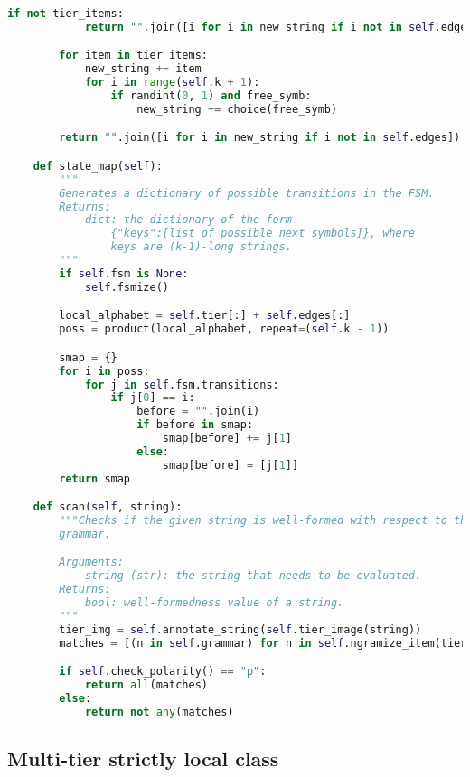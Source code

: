 \begin{lstlisting}[language=Python]
        if not tier_items:
            return "".join([i for i in new_string if i not in self.edges])

        for item in tier_items:
            new_string += item
            for i in range(self.k + 1):
                if randint(0, 1) and free_symb:
                    new_string += choice(free_symb)

        return "".join([i for i in new_string if i not in self.edges])

    def state_map(self):
        """
        Generates a dictionary of possible transitions in the FSM.
        Returns:
            dict: the dictionary of the form
                {"keys":[list of possible next symbols]}, where 
                keys are (k-1)-long strings.
        """
        if self.fsm is None:
            self.fsmize()

        local_alphabet = self.tier[:] + self.edges[:]
        poss = product(local_alphabet, repeat=(self.k - 1))

        smap = {}
        for i in poss:
            for j in self.fsm.transitions:
                if j[0] == i:
                    before = "".join(i)
                    if before in smap:
                        smap[before] += j[1]
                    else:
                        smap[before] = [j[1]]
        return smap

    def scan(self, string):
        """Checks if the given string is well-formed with respect to the given
        grammar.

        Arguments:
            string (str): the string that needs to be evaluated.
        Returns:
            bool: well-formedness value of a string.
        """
        tier_img = self.annotate_string(self.tier_image(string))
        matches = [(n in self.grammar) for n in self.ngramize_item(tier_img)]

        if self.check_polarity() == "p":
            return all(matches)
        else:
            return not any(matches)
\end{lstlisting}

\subsection*{Multi-tier strictly local class}

